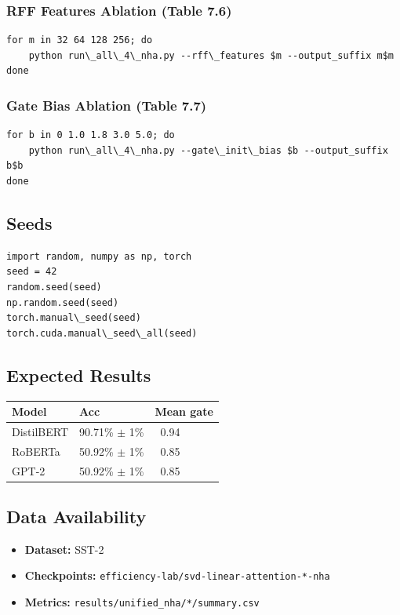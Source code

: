 \subsubsection{RFF Features Ablation (Table 7.6)}
\begin{lstlisting}
for m in 32 64 128 256; do
    python run\_all\_4\_nha.py --rff\_features $m --output_suffix m$m
done
\end{lstlisting}

\subsubsection{Gate Bias Ablation (Table 7.7)}
\begin{lstlisting}
for b in 0 1.0 1.8 3.0 5.0; do
    python run\_all\_4\_nha.py --gate\_init\_bias $b --output_suffix b$b
done
\end{lstlisting}

\subsection{Seeds}

\begin{lstlisting}
import random, numpy as np, torch
seed = 42
random.seed(seed)
np.random.seed(seed)
torch.manual\_seed(seed)
torch.cuda.manual\_seed\_all(seed)
\end{lstlisting}

\subsection{Expected Results}

\begin{table}[H]
\centering
\small
\begin{tabular}{lll}
\toprule
\textbf{Model} & \textbf{Acc} & \textbf{Mean gate} \\
\midrule
DistilBERT & 90.71\% $\pm$ 1\% & ~0.94 \\
RoBERTa & 50.92\% $\pm$ 1\% & ~0.85 \\
GPT-2 & 50.92\% $\pm$ 1\% & ~0.85 \\
\bottomrule
\end{tabular}
\end{table}

\subsection{Data Availability}

\begin{itemize}
\item \textbf{Dataset:} SST-2
\item \textbf{Checkpoints:} \texttt{efficiency-lab/svd-linear-attention-*-nha}
\item \textbf{Metrics:} \texttt{results/unified\_nha/*/summary.csv}

\end{itemize}
